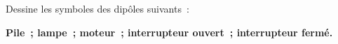 Dessine les symboles des dipôles suivants~:

\textbf{Pile~; lampe~; moteur~; interrupteur ouvert~; interrupteur fermé.}


